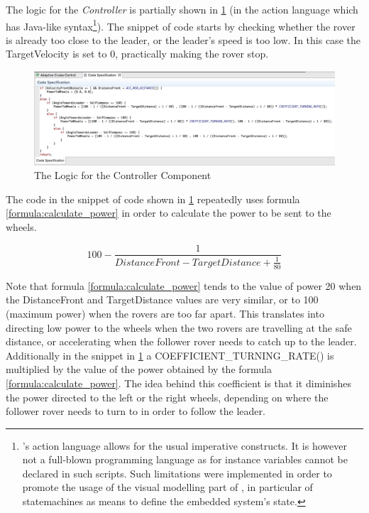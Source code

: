 The logic for the \emph{Controller} is partially shown in
\fig\ref{fig:controller_logic} (in the \af action language which has Java-like syntax\footnote{\af 's action
language allows for the usual imperative constructs. It is however not a
full-blown programming language as for instance variables cannot be declared
in such scripts. Such limitations were implemented in order to promote the
usage of the visual modelling part of \af, in particular of statemachines as
means to define the embedded system's state.}).
The snippet of code starts by checking whether the rover is already too close to the
leader, or the leader's speed is too low. In this case the
\textsf{TargetVelocity} is set to \textsf{0}, practically making the rover stop.

\begin{figure}[!h]
\centering
\includegraphics[width=1\textwidth]{images/code_spec_controller.png}
\caption{The Logic for the Controller Component}
\label{fig:controller_logic}
\end{figure}

The code in the snippet of code shown in \fig\ref{fig:controller_logic}
repeatedly uses formula \ref{formula:calculate_power} in order to calculate the
power to be sent to the wheels.

\begin{equation}
100 - \frac{1}{DistanceFront - TargetDistance + \frac{1}{80}}
\label{formula:calculate_power}
\end{equation}

Note that formula \ref{formula:calculate_power} tends to the value of power 20
when the \textsf{DistanceFront} and \textsf{TargetDistance} values are
very similar, or to 100 (maximum power) when the rovers are too far apart. This
translates into directing low power to the wheels when the two rovers are travelling at the
safe distance, or accelerating when the follower rover needs to catch up to the
leader. Additionally in the snippet in \fig\ref{fig:controller_logic} a
\textsf{COEFFICIENT\_TURNING\_RATE()} is multiplied by the value of the power
obtained by the formula \ref{formula:calculate_power}. The idea behind this
coefficient is that it diminishes the power directed to the left or the right
wheels, depending on where the follower rover needs to turn to in order to
follow the leader.

